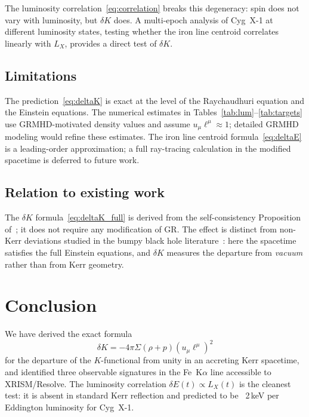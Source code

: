 \documentclass[12pt,a4paper]{article}
\begin{document}
The luminosity correlation~\eqref{eq:correlation} breaks this
degeneracy: spin does not vary with luminosity, but $\delta K$
does.
A multi-epoch analysis of Cyg~X-1 at different luminosity
states, testing whether the iron line centroid correlates
linearly with $L_X$, provides a direct test of $\delta K$.

\subsection{Limitations}

The prediction~\eqref{eq:deltaK} is exact at the level of the
Raychaudhuri equation and the Einstein equations.
The numerical estimates in Tables~\ref{tab:lum}--\ref{tab:targets}
use GRMHD-motivated density values and assume
$u_\mu\ell^\mu\approx1$; detailed GRMHD modeling would
refine these estimates.
The iron line centroid formula~\eqref{eq:deltaE} is a
leading-order approximation; a full ray-tracing calculation
in the modified spacetime is deferred to future work.

\subsection{Relation to existing work}

The $\delta K$ formula~\eqref{eq:deltaK_full} is derived
from the self-consistency Proposition of~\cite{K1note};
it does not require any modification of GR.
The effect is distinct from non-Kerr deviations studied in
the bumpy black hole literature~\cite{Collins2004}:
here the spacetime satisfies the full Einstein equations,
and $\delta K$ measures the departure from \emph{vacuum}
rather than from Kerr geometry.

\section{Conclusion}\label{sec:conc}

We have derived the exact formula
\begin{equation*}
  \delta K = -4\pi\Sigma(\rho+p)(u_\mu\ell^\mu)^2
\end{equation*}
for the departure of the $K$-functional from unity in an
accreting Kerr spacetime, and identified three observable
signatures in the Fe~K$\alpha$ line accessible to
XRISM/Resolve.
The luminosity correlation $\delta E(t)\propto L_X(t)$ is
the cleanest test: it is absent in standard Kerr reflection
and predicted to be ~2\,keV per Eddington luminosity for Cyg~X-1.
\end{document}
